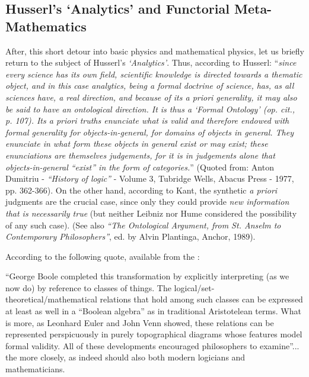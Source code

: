 \documentclass[12pt]{article}
\theoremstyle{plain}
\theoremstyle{definition}
\numberwithin{equation}{section}
\begin{document}
\subsection{Husserl's `Analytics' and Functorial Meta-Mathematics }
After, this short detour into basic physics and mathematical physics, let us briefly return to the subject of Husserl's \emph{`Analytics'}. Thus, according to Husserl: ``{\em since every science has its own field, scientific knowledge is directed towards a thematic object, and in this case analytics, being a formal doctrine of science, has, as all sciences have, a real direction, and because of its a priori generality, it may also be said to have an ontological direction. It is thus a `Formal Ontology' (\textit{op. cit.}, p. 107). Its a priori truths enunciate what is valid and therefore endowed with formal generality for objects-in-general, for domains of objects in general. They enunciate in what form these objects in general exist or may exist; these enunciations are themselves judgements, for it is in judgements alone that objects-in-general ``exist'' in the form of categories.}'' (Quoted from: Anton Dumitriu - \emph{``History of logic''} - Volume 3, Tubridge Wells, Abacus Press - 1977, pp. 362-366). On the other hand, according to Kant, the synthetic \emph{a priori} judgments are the crucial case, since only they could provide \emph{new information that is necessarily true} (but neither Leibniz nor Hume considered the possibility of any such case).
(See also {\em ``The Ontological Argument, from St. Anselm to Contemporary Philosophers''}, ed. by Alvin Plantinga, Anchor, 1989).

According to the following quote, available from the :

``George Boole completed this transformation by explicitly interpreting
 (as we now do) by reference to classes of things. The logical/set-theoretical/mathematical relations that hold among such classes can be expressed at least as well in a ``Boolean algebra'' as in traditional Aristotelean terms. What is more, as Leonhard Euler and John Venn showed, these relations can be represented perspicuously in purely topographical diagrams whose features model formal validity. All of these developments encouraged philosophers to examine''... the  more closely, as indeed should also both modern logicians and mathematicians.
\end{document}
